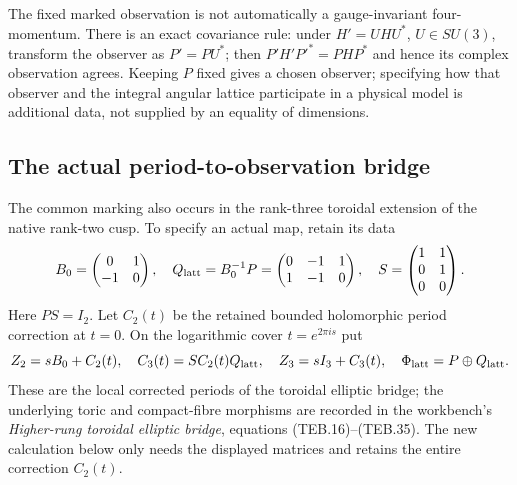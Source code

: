 The fixed marked observation is not automatically a gauge-invariant
four-momentum. There is an exact covariance rule: under
$H'=UHU^*$, $U\in SU(3)$, transform the observer as $P'=PU^*$;
then $P'H'P'^*=PHP^*$ and hence its complex observation agrees.
Keeping $P$ fixed gives a chosen observer; specifying how that observer
and the integral angular lattice participate in a physical model is
additional data, not supplied by an equality of dimensions.

\subsection{The actual period-to-observation bridge}
The common marking also occurs in the rank-three toroidal extension of
the native rank-two cusp. To specify an actual map, retain its data
\[
 B_0=\begin{pmatrix}0&1\\-1&0\end{pmatrix},\quad
 Q_{\rm latt}=B_0^{-1}P=\begin{pmatrix}0&-1&1\\1&-1&0\end{pmatrix},
 \quad S=\begin{pmatrix}1&1\\0&1\\0&0\end{pmatrix}.
\]
Here $PS=I_2$. Let $C_2(t)$ be the retained bounded holomorphic period
correction at $t=0$. On the logarithmic cover $t=e^{2\pi i s}$ put
\[
 Z_2=sB_0+C_2(t),\quad C_3(t)=SC_2(t)Q_{\rm latt},\quad
 Z_3=sI_3+C_3(t),\quad \Phi_{\rm latt}=P\oplus Q_{\rm latt}.
\]
These are the local corrected periods of the toroidal elliptic bridge;
the underlying toric and compact-fibre morphisms are recorded in the
workbench's \emph{Higher-rung toroidal elliptic bridge}, equations
(TEB.16)--(TEB.35). The new calculation below only needs the displayed
matrices and retains the entire correction $C_2(t)$.

